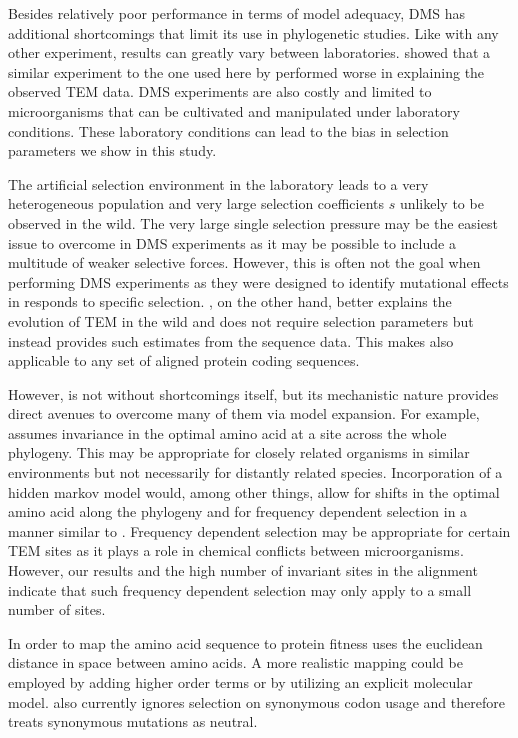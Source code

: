 \documentclass[fleqn,letterpaper]{article}
\begin{document}
Besides relatively poor performance in terms of model adequacy, DMS has additional shortcomings that limit its use in phylogenetic studies.
Like with any other experiment, results can greatly vary between laboratories.
\citet{hilton2017} showed that a similar experiment to the one used here by \citet{firnberg2014} performed worse in explaining the observed TEM data.
DMS experiments are also costly and limited to microorganisms that can be cultivated and manipulated under laboratory conditions.
These laboratory conditions can lead to the bias in selection parameters we show in this study.

The artificial selection environment in the laboratory leads to a very heterogeneous population and very large selection coefficients $s$ unlikely to be observed in the wild.
The very large single selection pressure may be the easiest issue to overcome in DMS experiments as it may be possible to include a multitude of weaker selective forces.
However, this is often not the goal when performing DMS experiments as they were designed to identify mutational effects in responds to specific selection.
\selac, on the other hand, better explains the evolution of TEM in the wild and does not require selection parameters but instead provides such estimates from the sequence data.
This makes \selac also applicable to any set of aligned protein coding sequences.

However, \selac is  not without shortcomings itself, but its mechanistic nature provides direct avenues to overcome many of them via model expansion.
For example, \selac assumes invariance in the optimal amino acid at a site across the whole phylogeny.
This may be appropriate for closely related organisms in similar environments but not necessarily for distantly related species.
Incorporation of a hidden markov model would, among other things, allow for shifts in the optimal amino acid along the phylogeny and for frequency dependent selection in a manner similar to \gy.
Frequency dependent selection may be appropriate for certain TEM sites as it plays a role in chemical conflicts between microorganisms.
However, our results and the high number of invariant sites in the alignment indicate that such frequency dependent selection may only apply to a small number of sites.

In order to map the amino acid sequence to protein fitness \selac uses the euclidean distance in \PC space between amino acids. 
A more realistic mapping could be employed by adding higher order terms or by utilizing an explicit molecular model.
\selac also currently ignores selection on synonymous codon usage and therefore treats synonymous mutations as neutral.
\end{document}
